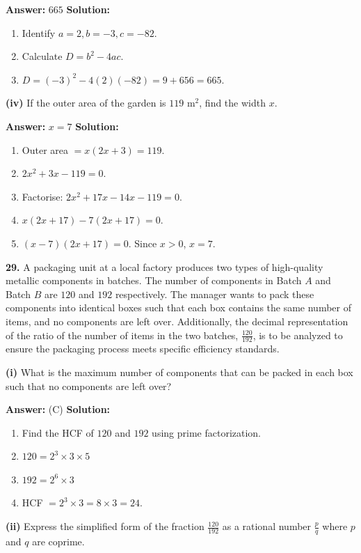 \documentclass[12pt,a4paper]{exam}
\begin{document}
\begin{questions}
\textbf{Answer:} $665$
\textbf{Solution:}
\begin{enumerate}
  \item Identify $a=2, b=-3, c=-82$.
  \item Calculate $D = b^2 - 4ac$.
  \item $D = (-3)^2 - 4(2)(-82) = 9 + 656 = 665$.
\end{enumerate}

\textbf{(iv)} If the outer area of the garden is $119$ m$^2$, find the width $x$.

\textbf{Answer:} $x = 7$
\textbf{Solution:}
\begin{enumerate}
  \item Outer area $= x(2x+3) = 119$.
  \item $2x^2 + 3x - 119 = 0$.
  \item Factorise: $2x^2 + 17x - 14x - 119 = 0$.
  \item $x(2x+17) - 7(2x+17) = 0$.
  \item $(x-7)(2x+17) = 0$. Since $x > 0$, $x = 7$.
\end{enumerate}

\vspace{0.3cm}

\question \textbf{29.} A packaging unit at a local factory produces two types of high-quality metallic components in batches. The number of components in Batch $A$ and Batch $B$ are $120$ and $192$ respectively. The manager wants to pack these components into identical boxes such that each box contains the same number of items, and no components are left over. Additionally, the decimal representation of the ratio of the number of items in the two batches, $\frac{120}{192}$, is to be analyzed to ensure the packaging process meets specific efficiency standards.

\textbf{(i)} What is the maximum number of components that can be packed in each box such that no components are left over?

\textbf{Answer:} (C)
\textbf{Solution:}
\begin{enumerate}
  \item Find the HCF of $120$ and $192$ using prime factorization.
  \item $120 = 2^3 \times 3 \times 5$
  \item $192 = 2^6 \times 3$
  \item HCF $= 2^3 \times 3 = 8 \times 3 = 24$.
\end{enumerate}

\textbf{(ii)} Express the simplified form of the fraction $\frac{120}{192}$ as a rational number $\frac{p}{q}$ where $p$ and $q$ are coprime.


\end{questions}
\end{document}
